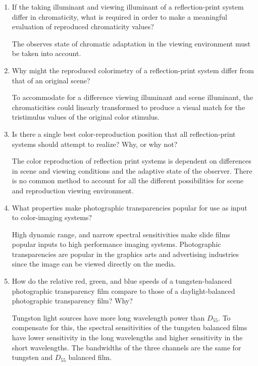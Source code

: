 \documentclass{amsart}
\theoremstyle{definition}
\theoremstyle{remark}
\numberwithin{equation}{section}
\begin{document}
\begin{enumerate}
\item  If the taking illuminant and viewing illuminant of a
reflection-print system differ in chromaticity, what is required
in order to make a meaningful evaluation of reproduced
chromaticity values?
\newline
\par The observes state of chromatic adaptation in the viewing environment must be taken into
account.
\newline

\item  Why might the reproduced colorimetry of a reflection-print
system differ from that of an original scene?
\newline
\par To accommodate for a difference viewing
illuminant and scene illuminant, the chromaticities could linearly
transformed to produce a visual match for the tristimulus values
of the original color stimulus.
\newline

\item  Is there a single best color-reproduction position that all
reflection-print systems should attempt to realize? Why, or why
not?
\newline
\par  The color reproduction of reflection print systems is
dependent on differences in scene and viewing conditions and the
adaptive state of the observer.  There is no common method to
account for all the different possibilities for scene and
reproduction viewing environment.

\item What properties make photographic transparencies popular for
use as input to color-imaging systems?
\newline \par High dynamic range, and narrow spectral
sensitivities make slide films popular inputs to high performance
imaging systems.  Photographic transparencies are popular in the
graphics arts and advertising industries since the image can be
viewed directly on the media.
\newline

\item  How do the relative red, green, and blue speeds of a
tungsten-balanced photographic transparency film compare to those
of a daylight-balanced photographic transparency film? Why?
\newline \par Tungston light sources have more long wavelength
power than $D_{55}$.  To compensate for this, the spectral
sensitivities of the tungsten balanced films have lower
sensitivity in the long wavelengths and higher sensitivity in the
short wavelengths.  The bandwidths of the three channels are the
same for tungsten and $D_{55}$ balanced film.
\newline


\end{enumerate}
\end{document}
